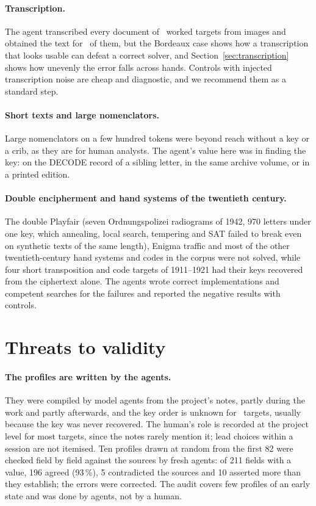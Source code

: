 \documentclass[11pt]{article}
\begin{document}
\paragraph{Transcription.} The agent transcribed every document of \Nimg\ worked targets from images and obtained the text for \Nimgobtained\ of them, but the Bordeaux case shows how a transcription that looks usable can defeat a correct solver, and Section~\ref{sec:transcription} shows how unevenly the error falls across hands. Controls with injected transcription noise are cheap and diagnostic, and we recommend them as a standard step.

\paragraph{Short texts and large nomenclators.} Large nomenclators on a few hundred tokens were beyond reach without a key or a crib, as they are for human analysts. The agent's value here was in finding the key: on the DECODE record of a sibling letter, in the same archive volume, or in a printed edition.

\paragraph{Double encipherment and hand systems of the twentieth century.} The double Playfair (seven Ordnungspolizei radiograms of 1942, 970 letters under one key, which annealing, local search, tempering and SAT failed to break even on synthetic texts of the same length), Enigma traffic and most of the other twentieth-century hand systems and codes in the corpus were not solved, while four short transposition and code targets of 1911--1921 had their keys recovered from the ciphertext alone. The agents wrote correct implementations and competent searches for the failures and reported the negative results with controls.

\section{Threats to validity}
\label{sec:validity}

\paragraph{The profiles are written by the agents.} They were compiled by model agents from the project's notes, partly during the work and partly afterwards, and the key order is unknown for \Nkeyorderunknown\ targets, usually because the key was never recovered. The human's role is recorded at the project level for most targets, since the notes rarely mention it; lead choices within a session are not itemised. Ten profiles drawn at random from the first 82 were checked field by field against the sources by fresh agents: of 211 fields with a value, 196 agreed (93\,\%), 5 contradicted the sources and 10 asserted more than they establish; the errors were corrected. The audit covers few profiles of an early state and was done by agents, not by a human.
\end{document}
